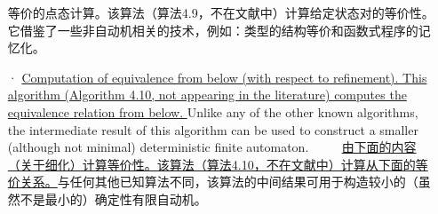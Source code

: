 \begin{itemize}
    等价的点态计算。该算法（算法4.9，不在文献中）计算给定状态对的等价性。它借鉴了一些非自动机相关的技术，例如：类型的结构等价和函数式程序的记忆化。

    \item[·] \uline{Computation of equivalence from below (with respect to refinement). This algorithm (Algorithm 4.10, not appearing in the literature) computes the equivalence relation from below. } Unlike any of the other known algorithms, the intermediate result of this algorithm can be used to construct a smaller (although not minimal) deterministic finite automaton.
　　\newline
    \uline{由下面的内容（关于细化）计算等价性。该算法（算法4.10，不在文献中）计算从下面的等价关系。}与任何其他已知算法不同，该算法的中间结果可用于构造较小的（虽然不是最小的）确定性有限自动机。

\end{itemize}